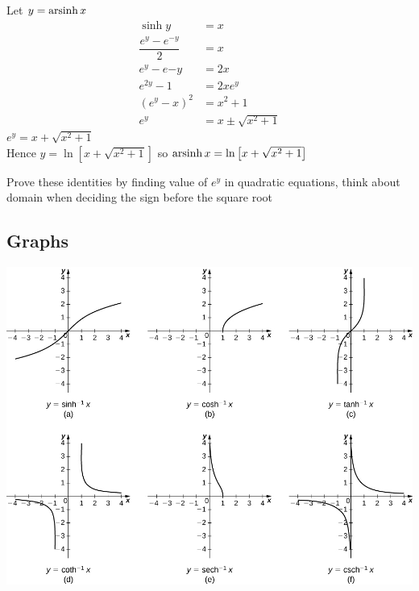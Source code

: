 \begin{solution}
    Let $y=\operatorname{arsinh} x$
    \begin{align*}
        \sinh y               & = x                    \\
        \dfrac{e^y-e^{-y}}{2} & = x                    \\
        e^y-e{-y}             & = 2x                   \\
        e^{2y} - 1            & = 2x e^y               \\
        (e^y-x)^2             & = x^2 + 1              \\
        e^y                   & = x \pm \sqrt{x^2 + 1}
    \end{align*}
    $e^y = x + \sqrt{x^2 + 1}$ \\
    Hence $y = \ln \left[x+\sqrt{x^2+1}\right]$ so $\operatorname{arsinh} x = \ln \left[x+\sqrt{x^2+1}\right]$
\end{solution}

\begin{remark}
    Prove these identities by finding value of $e^y$ in quadratic equations, think about domain when deciding the sign before the square root
\end{remark}

\subsection{Graphs}
\includegraphics[width=\linewidth]{images/hyperbolic_inverse_graphs}



